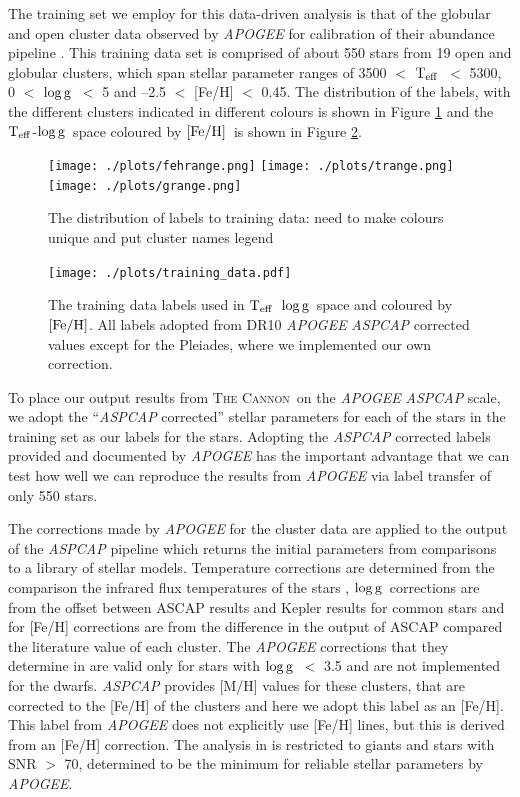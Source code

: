 \documentclass[12pt, preprint]{aastex}
\newcommand{\teff}{\mbox{$\rm T_{eff}$}}
\newcommand{\feh}{\mbox{$\rm [Fe/H]$}}
\newcommand{\logg}{\mbox{$\rm \log g$}}
\newcommand{\tc}{\textsc{The Cannon}}
\begin{document}
The training set we employ for this data-driven analysis is that of the globular and open cluster data observed by \textit{APOGEE} for calibration of their abundance pipeline \citep{Meszaros2013}. This training data set is comprised of about 550 stars from 19 open and globular clusters, which span stellar parameter ranges of 3500 $<$ \teff\ $<$ 5300, 0 $<$ \logg\ $<$ 5 and --2.5 $<$ [Fe/H] $<$ 0.45. The distribution of the labels, with the different clusters indicated in different colours is shown in Figure \ref{fig:training} and the \teff-\logg\ space coloured by \feh\ is shown in Figure \ref{fig:training_tgfeh}. 

\begin{figure}[h!]
  \texttt{[image: ./plots/fehrange.png]}
    \texttt{[image: ./plots/trange.png]}
      \texttt{[image: ./plots/grange.png]}
  \caption{The distribution of labels to training data: need to make colours unique and put cluster names legend}
\label{fig:training}
\end{figure}

\begin{figure}[h!]
\centering
  \texttt{[image: ./plots/training\_data.pdf]}
\caption{The training data labels used in \teff\, \logg\ space and coloured by \feh. All labels adopted from DR10 \textit{APOGEE} \textit{\textit{ASPCAP}} corrected values except for the Pleiades, where we implemented our own correction. }
\label{fig:training_tgfeh}
\end{figure}


To place our output results from \tc\ on the \textit{APOGEE} \textit{\textit{ASPCAP}} scale, we adopt the ``\textit{ASPCAP} corrected'' stellar parameters for each of the stars in the training set as our labels for the stars. Adopting the \textit{ASPCAP} corrected labels provided and documented by \textit{APOGEE} has the important advantage that we can test how well we can reproduce the results from \textit{APOGEE} via  label transfer of only 550 stars.

The corrections made by \textit{APOGEE} for the cluster data are applied to the output of the \textit{ASPCAP} pipeline which returns the initial parameters from comparisons to a library of stellar models. Temperature corrections are determined from the comparison the infrared flux temperatures of the stars \citep{Gonzalez2009}, \logg\ corrections are from the offset between ASCAP results and Kepler results for common stars and for [Fe/H] corrections are from the difference in the output of ASCAP compared the literature value of each cluster.  The \textit{APOGEE} corrections that they determine in \citet{Meszaros2013} are valid only for stars with \logg\ $<$ 3.5 and are not implemented for the dwarfs. \textit{ASPCAP} provides [M/H] values for these clusters, that are corrected to the [Fe/H] of the clusters and here we adopt this label as an [Fe/H]. This label from \textit{APOGEE} does not explicitly use [Fe/H] lines, but this is derived from an [Fe/H] correction. The analysis in \citet{Meszaros2013} is restricted to giants and stars with SNR $>$ 70, determined to be the minimum for reliable stellar parameters by \textit{APOGEE}. 
\end{document}
